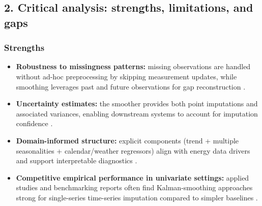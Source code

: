 \subsection*{2. Critical analysis: strengths, limitations, and gaps}
\subsubsection*{Strengths}
\begin{itemize}
\item \textbf{Robustness to missingness patterns:} missing observations are handled without ad-hoc preprocessing by skipping measurement updates, while smoothing leverages past and future observations for gap reconstruction \cite{durbin2012}.
\item \textbf{Uncertainty estimates:} the smoother provides both point imputations and associated variances, enabling downstream systems to account for imputation confidence \cite{durbin2012}.
\item \textbf{Domain-informed structure:} explicit components (trend + multiple seasonalities + calendar/weather regressors) align with energy data drivers and support interpretable diagnostics \cite{harvey1989}.
\item \textbf{Competitive empirical performance in univariate settings:} applied studies and benchmarking reports often find Kalman-smoothing approaches strong for single-series time-series imputation compared to simpler baselines \cite{moritz2017,kannegowda2020}.
\end{itemize}


